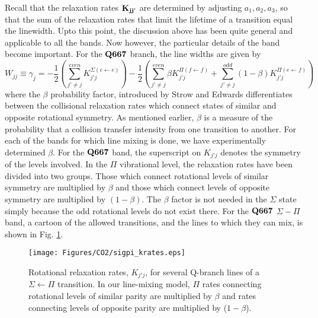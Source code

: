 \documentclass[11pt]{article}
\begin{document}
Recall that the relaxation rates ${\bf K_{jj'}}$ are determined
by adjusting $a_{1},a_{2},a_{3}$, so that the sum of the relaxation rates
that limit the lifetime of a transition equal the linewidth. 
Upto this point, the discussion above has been quite general and applicable
to all the bands. Now however, the particular details of the band become 
important. For the $\bf{Q 667}$ branch, the line widths are given by
\[
   W_{jj}\equiv\gamma_{j}=-\frac{1}{2}\left(
   \sum_{j'\neq j}^{even}K_{j'j}^{\Sigma(e\leftarrow e)}\right)-
   \frac{1}{2}\left(
   \sum_{j'\neq j}^{even}\beta K_{j'j}^{\Pi(f\leftarrow f)}+
   \sum_{j'\neq j}^{odd}(1-\beta)K_{j'j}^{\Pi(e\leftarrow f)}\right)
\]
where the $\beta$ probability factor, introduced by Strow and
Edwards \cite{edw:91} differentiates between the collisional relaxation
rates which connect states of similar and opposite rotational
symmetry. As mentioned earlier, $\beta$ is a measure of the probability that
a collision transfer intensity from one transition to another. For each of 
the bands for which line mixing is done, we have experimentally 
determined $\beta$. 
For the ${\bf Q 667}$ band, the superscript on $K_{j'j}$ denotes the 
symmetry of the levels involved.  In the $\Pi$ vibrational level, the 
relaxation rates have
been divided into two groups.  Those which connect rotational levels of
similar symmetry are multiplied by $\beta$ and those which connect levels
of opposite symmetry are multiplied by $(1-\beta)$.  The $\beta$ factor is
not needed in the $\Sigma$ state simply because the odd rotational levels
do not exist there. For the ${\bf Q 667}$ $\Sigma-\Pi$ band, a cartoon of 
the allowed transitions, and the lines
to which they can mix, is shown in Fig. \ref{fig:sigpi_krates}.

\begin{figure}[h]
\begin{center}
\texttt{[image: Figures/CO2/sigpi\_krates.eps]}
\end{center}
  \caption[Rotational relaxation rates, $K_{j'j}$, for several Q-branch
        lines of a $\Sigma\leftarrow\Pi$ transition.]
        {Rotational relaxation rates, $K_{j'j}$, for several Q-branch
        lines of a $\Sigma\leftarrow\Pi$ transition.  In our line-mixing
        model, $\Pi$ rates connecting rotational levels of similar parity
        are multiplied by $\beta$ and rates connecting levels of opposite 
        parity are multiplied by ($1-\beta$).} 
  \label{fig:sigpi_krates}
\end{figure}
\end{document}
